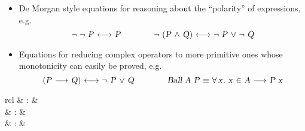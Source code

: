 \begin{isabellebody}
\begin{isamarkuptext}
\begin{itemize}
  \item De Morgan style equations for reasoning about the ``polarity''
  of expressions, e.g.
  \[
  \isa{{\isaliteral{22}{\isachardoublequote}}{\isaliteral{5C3C6E6F743E}{\isasymnot}}\ {\isaliteral{5C3C6E6F743E}{\isasymnot}}\ P\ {\isaliteral{5C3C6C6F6E676C65667472696768746172726F773E}{\isasymlongleftrightarrow}}\ P{\isaliteral{22}{\isachardoublequote}}} \qquad\qquad
  \isa{{\isaliteral{22}{\isachardoublequote}}{\isaliteral{5C3C6E6F743E}{\isasymnot}}\ {\isaliteral{28}{\isacharparenleft}}P\ {\isaliteral{5C3C616E643E}{\isasymand}}\ Q{\isaliteral{29}{\isacharparenright}}\ {\isaliteral{5C3C6C6F6E676C65667472696768746172726F773E}{\isasymlongleftrightarrow}}\ {\isaliteral{5C3C6E6F743E}{\isasymnot}}\ P\ {\isaliteral{5C3C6F723E}{\isasymor}}\ {\isaliteral{5C3C6E6F743E}{\isasymnot}}\ Q{\isaliteral{22}{\isachardoublequote}}}
  \]

  \item Equations for reducing complex operators to more primitive
  ones whose monotonicity can easily be proved, e.g.
  \[
  \isa{{\isaliteral{22}{\isachardoublequote}}{\isaliteral{28}{\isacharparenleft}}P\ {\isaliteral{5C3C6C6F6E6772696768746172726F773E}{\isasymlongrightarrow}}\ Q{\isaliteral{29}{\isacharparenright}}\ {\isaliteral{5C3C6C6F6E676C65667472696768746172726F773E}{\isasymlongleftrightarrow}}\ {\isaliteral{5C3C6E6F743E}{\isasymnot}}\ P\ {\isaliteral{5C3C6F723E}{\isasymor}}\ Q{\isaliteral{22}{\isachardoublequote}}} \qquad\qquad
  \isa{{\isaliteral{22}{\isachardoublequote}}Ball\ A\ P\ {\isaliteral{5C3C65717569763E}{\isasymequiv}}\ {\isaliteral{5C3C666F72616C6C3E}{\isasymforall}}x{\isaliteral{2E}{\isachardot}}\ x\ {\isaliteral{5C3C696E3E}{\isasymin}}\ A\ {\isaliteral{5C3C6C6F6E6772696768746172726F773E}{\isasymlongrightarrow}}\ P\ x{\isaliteral{22}{\isachardoublequote}}}
  \]

  \end{itemize}

\end{isamarkuptext}%
\isamarkuptrue%
%
\isamarkuptrue%
%
\begin{isamarkuptext}%
\begin{matharray}{rcl}
    \hypertarget{method.HOL.arith}{\hyperlink{method.HOL.arith}{\mbox{}}} & : &  \\
    \hypertarget{attribute.HOL.arith}{\hyperlink{attribute.HOL.arith}{\mbox{}}} & : &  \\
    \hypertarget{attribute.HOL.arith-split}{\hyperlink{attribute.HOL.arith-split}{\mbox{}}} & : &  \\
  \end{matharray}


\end{isamarkuptext}
\end{isabellebody}
